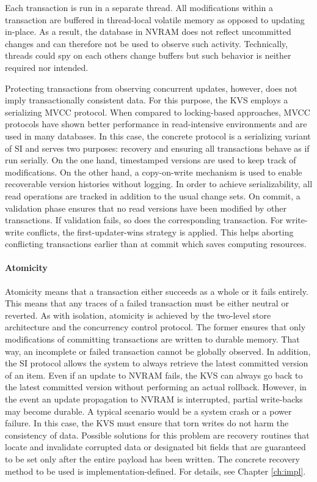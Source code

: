 Each transaction is run in a separate thread. All modifications within a
transaction are buffered in thread-local volatile memory as opposed to updating
in-place. As a result, the database in \ac{NVRAM} does not reflect uncommitted
changes and can therefore not be used to observe such activity. Technically,
threads could spy on each others change buffers but such behavior is neither
required nor intended.

\vfill
\newpage

Protecting transactions from observing concurrent updates, however, does not
imply transactionally consistent data. For this purpose, the \ac{KVS} employs a
serializing \ac{MVCC} protocol. When compared to locking-based approaches,
\ac{MVCC} protocols have shown better performance in read-intensive environments
and are used in many databases. In this case, the concrete protocol is a
serializing variant of \ac{SI} and serves two purposes: recovery and ensuring
all transactions behave as if run serially. On the one hand, timestamped
versions are used to keep track of modifications. On the other hand, a
copy-on-write mechanism is used to enable recoverable version histories without
logging. In order to achieve serializability, all read operations are tracked in addition to the usual change sets. On commit, a validation phase ensures that no read versions have been modified by other transactions. If validation fails, so does the corresponding transaction. For write-write conflicts, the first-updater-wins strategy is applied. This helps aborting conflicting transactions earlier than at commit which saves computing resources.

\paragraph{Atomicity}

Atomicity means that a transaction either succeeds as a whole or it fails
entirely. This means that any traces of a failed transaction must be either
neutral or reverted. As with isolation, atomicity is achieved by the two-level
store architecture and the concurrency control protocol. The former ensures that
only modifications of committing transactions are written to durable memory.
That way, an incomplete or failed transaction cannot be globally observed. In
addition, the \ac{SI} protocol allows the system to always retrieve the latest
committed version of an item. Even if an update to \ac{NVRAM} fails, the
\ac{KVS} can always go back to the latest committed version without performing
an actual rollback. However, in the event an update propagation to \ac{NVRAM} is
interrupted, partial write-backs may become durable. A typical scenario would be
a system crash or a power failure. In this case, the \ac{KVS} must ensure that
torn writes do not harm the consistency of data. Possible solutions for this
problem are recovery routines that locate and invalidate corrupted data or
designated bit fields that are guaranteed to be set only after the entire payload
has been written. The concrete recovery method to be used is
implementation-defined. For details, see Chapter \ref{ch:impl}.

